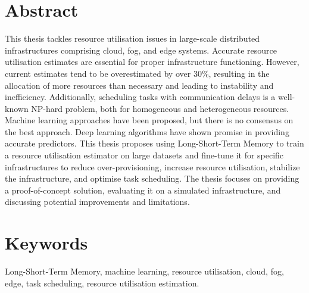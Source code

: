 \section*{Abstract}
\label{sec:abstract}

  This thesis tackles resource utilisation issues in large-scale distributed infrastructures comprising cloud, fog, and edge systems. Accurate resource utilisation estimates are essential for proper infrastructure functioning. However, current estimates tend to be overestimated by over 30\%, resulting in the allocation of more resources than necessary and leading to instability and inefficiency. Additionally, scheduling tasks with communication delays is a well-known NP-hard problem, both for homogeneous and heterogeneous resources. Machine learning approaches have been proposed, but there is no consensus on the best approach. Deep learning algorithms have shown promise in providing accurate predictors. This thesis proposes using Long-Short-Term Memory to train a resource utilisation estimator on large datasets and fine-tune it for specific infrastructures to reduce over-provisioning, increase resource utilisation, stabilize the infrastructure, and optimise task scheduling. The thesis focuses on providing a proof-of-concept solution, evaluating it on a simulated infrastructure, and discussing potential improvements and limitations. 


\section*{Keywords}
\label{sec:keywords}

  Long-Short-Term Memory, machine learning, resource utilisation, cloud, fog, edge,  task scheduling, resource utilisation estimation.
